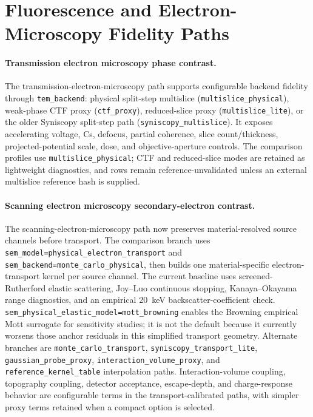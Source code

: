 \appendix

\section{Fluorescence and Electron-Microscopy Fidelity Paths}
\label{sec:appendix-non-scalar-modalities}

\paragraph{Transmission electron microscopy phase contrast.} The transmission-electron-microscopy path supports configurable backend fidelity through \texttt{tem\_backend}: physical split-step multislice (\texttt{multislice\_physical}), weak-phase CTF proxy (\texttt{ctf\_proxy}), reduced-slice proxy (\texttt{multislice\_lite}), or the older Syniscopy split-step path (\texttt{syniscopy\_multislice}). It exposes accelerating voltage, Cs, defocus, partial coherence, slice count/thickness, projected-potential scale, dose, and objective-aperture controls. The comparison profiles use \texttt{multislice\_physical}; CTF and reduced-slice modes are retained as lightweight diagnostics, and rows remain reference-unvalidated unless an external multislice reference hash is supplied.

\paragraph{Scanning electron microscopy secondary-electron contrast.} The scanning-electron-microscopy path now preserves material-resolved source channels before transport. The comparison branch uses \texttt{sem\_model=\allowbreak physical\_electron\_transport} and \texttt{sem\_backend=\allowbreak monte\_carlo\_physical}, then builds one material-specific electron-transport kernel per source channel. The current baseline uses screened-Rutherford elastic scattering, Joy--Luo continuous stopping, Kanaya--Okayama range diagnostics, and an empirical 20~keV backscatter-coefficient check. \texttt{sem\_physical\_elastic\_model=\allowbreak mott\_browning} enables the Browning empirical Mott surrogate for sensitivity studies; it is not the default because it currently worsens those anchor residuals in this simplified transport geometry. Alternate branches are \texttt{monte\_carlo\_transport}, \texttt{syniscopy\_transport\_lite}, \texttt{gaussian\_probe\_proxy}, \texttt{interaction\_volume\_proxy}, and \texttt{reference\_kernel\_table} interpolation paths. Interaction-volume coupling, topography coupling, detector acceptance, escape-depth, and charge-response behavior are configurable terms in the transport-calibrated paths, with simpler proxy terms retained when a compact option is selected.

